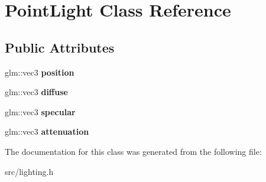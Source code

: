 \hypertarget{class_point_light}{}\section{Point\+Light Class Reference}
\label{class_point_light}
\subsection*{Public Attributes}
\begin{DoxyCompactItemize}
\item 
\hypertarget{class_point_light_a6dc6e70f9a91e8a6bbecf08707143cad}{}glm\+::vec3 {\bfseries position}\label{class_point_light_a6dc6e70f9a91e8a6bbecf08707143cad}

\item 
\hypertarget{class_point_light_a3ea5c72fc0aa24e9c7434d33b45c5fdb}{}glm\+::vec3 {\bfseries diffuse}\label{class_point_light_a3ea5c72fc0aa24e9c7434d33b45c5fdb}

\item 
\hypertarget{class_point_light_a5154d2f188525f9365ee9f988b1ec353}{}glm\+::vec3 {\bfseries specular}\label{class_point_light_a5154d2f188525f9365ee9f988b1ec353}

\item 
\hypertarget{class_point_light_a8ca1748db53411217b9462120098b7a1}{}glm\+::vec3 {\bfseries attenuation}\label{class_point_light_a8ca1748db53411217b9462120098b7a1}

\end{DoxyCompactItemize}


The documentation for this class was generated from the following file\+:\begin{DoxyCompactItemize}
\item 
src/lighting.\+h\end{DoxyCompactItemize}
